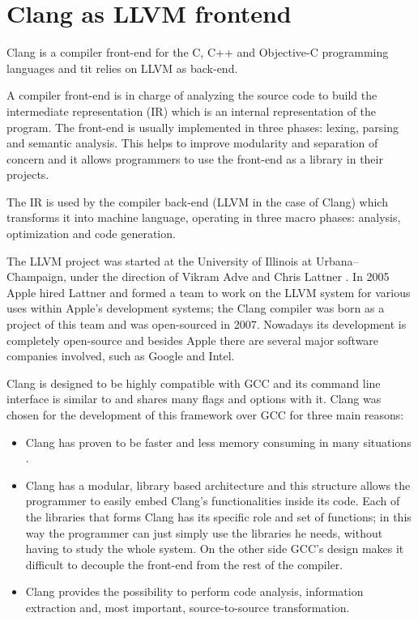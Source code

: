 \documentclass[a4paper,12pt,oneside]{book}
\begin{document}
\section{Clang as LLVM frontend}

Clang \cite{clang} is a compiler front-end for the C, C++ and Objective-C programming languages and tit relies on LLVM as back-end. 

A compiler front-end is in charge of analyzing the source code to build the intermediate representation (IR) which is an internal representation of the program. The front-end is usually implemented in three phases: lexing, parsing and semantic analysis. This helps to improve modularity and separation of concern and it allows programmers to use the front-end as a library in their projects. 

The IR is used by the compiler back-end (LLVM in the case of Clang) which transforms it into machine language, operating in three macro phases: analysis, optimization and code generation. 

The LLVM project was started at the University of Illinois at Urbana–Champaign, under the direction of Vikram Adve and Chris Lattner \cite{llvm1} \cite{llvm2}. In 2005 Apple hired Lattner and formed a team to work on the LLVM system for various uses within Apple's development systems; the Clang compiler was born as a project of this team and was open-sourced in 2007. Nowadays its development is completely open-source and besides Apple there are several major software companies involved, such as Google and Intel.

Clang is designed to be highly compatible with GCC and its command line interface is similar to and shares many flags and options with it. Clang was chosen for the development of this framework over GCC for three main reasons:
\begin{itemize}
 \item Clang has proven to be faster and less memory consuming in many situations \cite{clanggcc}. 
 \item Clang has a modular, library based architecture and this structure allows the programmer to easily embed Clang’s functionalities inside its code. Each of the libraries that forms Clang has its specific role and set of functions; in this way the programmer can just simply use the libraries he needs, without having to study the whole system. On the other side GCC's design makes it difficult to decouple the front-end from the rest of the compiler.
 \item Clang provides the possibility to perform code analysis, information extraction and, most important, source-to-source transformation.
\end{itemize}
\end{document}
